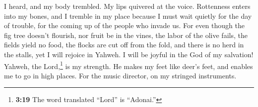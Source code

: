 \begin{paracol}{2}
\begin{otherlanguage}{english}
 I heard, and my body trembled. My lips quivered at the
voice. Rottenness enters into my bones, and I tremble in my place
because I must wait quietly for the day of trouble, for the coming up of
the people who invade us.  For even though the fig tree
doesn't flourish, nor fruit be in the vines, the labor of the olive
fails, the fields yield no food, the flocks are cut off from the fold,
and there is no herd in the stalls,  yet I will rejoice
in Yahweh. I will be joyful in the God of my salvation! 
Yahweh, the Lord,\footnote{\textbf{3:19} The word translated ``Lord'' is
  ``Adonai.''} is my strength. He makes my feet like deer's feet, and
enables me to go in high places. For the music director, on my stringed
instruments. \end{otherlanguage} \end{paracol}
